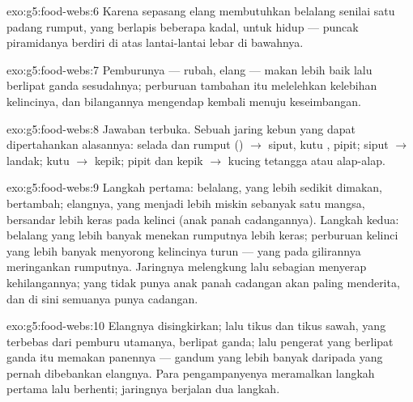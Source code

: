 \begin{solution}{exo:g5:food-webs:6}
Karena sepasang elang membutuhkan belalang senilai satu padang rumput,
yang berlapis beberapa kadal, untuk hidup --- puncak piramidanya
berdiri di atas lantai-lantai lebar di bawahnya.
\end{solution}

\begin{solution}{exo:g5:food-webs:7}
Pemburunya --- rubah, elang --- makan lebih baik lalu berlipat ganda
sesudahnya; perburuan tambahan itu melelehkan kelebihan kelincinya,
dan bilangannya mengendap kembali menuju keseimbangan.
\end{solution}

\begin{solution}{exo:g5:food-webs:8}
Jawaban terbuka. Sebuah jaring kebun yang dapat dipertahankan alasannya:
selada dan rumput () $\rightarrow$ siput, kutu , 
pipit; siput $\rightarrow$ landak; kutu  $\rightarrow$ kepik;
 pipit dan kepik $\rightarrow$ kucing tetangga atau alap-alap.
\end{solution}

\begin{solution}{exo:g5:food-webs:9}
Langkah pertama: belalang, yang lebih sedikit dimakan, bertambah;
elangnya, yang menjadi lebih miskin sebanyak satu mangsa, bersandar
lebih keras pada kelinci (anak panah cadangannya). Langkah kedua:
belalang yang lebih banyak menekan rumputnya lebih keras; perburuan
kelinci yang lebih banyak menyorong kelincinya turun --- yang pada
gilirannya meringankan rumputnya. Jaringnya melengkung lalu sebagian
menyerap kehilangannya;  yang tidak punya anak panah cadangan
akan paling menderita, dan di sini semuanya punya cadangan.
\end{solution}

\begin{solution}{exo:g5:food-webs:10}
Elangnya disingkirkan; lalu tikus dan tikus sawah, yang terbebas dari
pemburu utamanya, berlipat ganda; lalu  pengerat yang berlipat
ganda itu memakan panennya --- gandum yang lebih banyak daripada yang
pernah dibebankan elangnya. Para pengampanyenya meramalkan langkah
pertama lalu berhenti; jaringnya berjalan dua langkah.
\end{solution}

